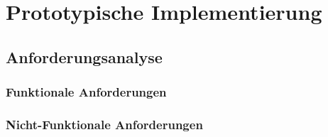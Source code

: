 \section{Prototypische Implementierung}
\label{sec:prototyp}

\subsection{Anforderungsanalyse}

\subsubsection{Funktionale Anforderungen}

\subsubsection{Nicht-Funktionale Anforderungen}